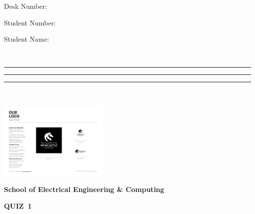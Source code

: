 \documentclass[a4paper,12pt]{article}
\newcommand{\quiznumber}{1} %
\begin{document}
\begin{doublespace}

  \vspace*{-10mm}


  \begin{minipage}[t]{0.23\linewidth}
    
    \footnotesize

    Desk Number:

    \vspace{0.5mm}

    Student Number:

    \vspace{0.5mm}

    Student Name: 

    {\ }
  \end{minipage}  \begin{minipage}[t]{0.4\linewidth}
    
    \footnotesize

    \rule{2cm}{0.2mm}

    \vspace{0.5mm}

    \rule{5cm}{0.2mm}

    \vspace{0.5mm}

    \rule{5cm}{0.2mm}

    {\ }
  \end{minipage}\hfill
  \begin{minipage}[b]{3.78cm}
    \hspace*{10mm}\includegraphics[height=3.78cm]{uon_logo_black_square.pdf}
    \vspace*{-3.78cm}
  \end{minipage}


  \vspace{20mm}



  \begin{center}
    \textbf{\large
      School of Electrical Engineering \& Computing}


    \textbf{\large QUIZ~\quiznumber}


\end{center}
\end{doublespace}
\end{document}
